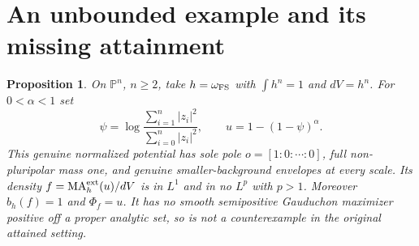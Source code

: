 \documentclass[11pt]{article}
\newcommand{\MA}{\operatorname{MA}}
\newcommand{\1}{\mathbf 1}
\newtheorem{proposition}[theorem]{Proposition}
\theoremstyle{remark}\newtheorem{remark}[theorem]{Remark}
\begin{document}
\section{An unbounded example and its missing attainment}
\begin{proposition}\label{prop:excluded}
On $\mathbb P^n$, $n\geq2$, take $h=\omega_{\rm FS}$ with
$\int h^n=1$ and $dV=h^n$. For $0<\alpha<1$ set
\[
 \psi=\log\frac{\sum_{i=1}^n|z_i|^2}{\sum_{i=0}^n|z_i|^2},\qquad
 u=1-(1-\psi)^\alpha.
\]
This genuine normalized potential has sole pole $o=[1:0:\cdots:0]$,
full non-pluripolar mass one, and genuine smaller-background envelopes at
every scale. Its density $f=\MA_h^{\rm ext}(u)/dV$ is in $L^1$ and in
no $L^p$ with $p>1$. Moreover $b_h(f)=1$ and $\Phi_f=u$.
It has no smooth semipositive Gauduchon maximizer positive off a proper
analytic set, so is not a counterexample in the original attained setting.
\end{proposition}
\end{document}
